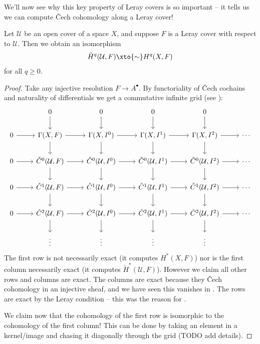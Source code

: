 \documentclass[11pt]{book}
\begin{document}
We'll now see why this key property of Leray covers is so important -- it tells us we can compute \v{C}ech cohomology along a Leray cover!

\begin{theorem}\label{thm:leray} 
Let $\mathcal{U}$ be an open cover of a space $X$, and suppose $F$ is a Leray cover with respect to $\mathcal{U}$. Then we obtain an isomorphism
\begin{align*}
    \check{H}^q(\mathcal{U},F) \xto{\sim} H^q(X,F)
\end{align*}
for all $q\ge0$.
\end{theorem}
\begin{proof} Take any injective resolution $F \to A^\bullet$. By functoriality of \v{C}ech cochains and naturality of differentials we get a commutative infinite grid (see \cite[p.~193]{Bredon-sheaf}):
\[ \begin{tikzcd}
     & 0\dar & 0\dar & 0\dar & 0\dar & \\
    0\rar & {\Gamma(X,F)}\rar\dar & {\Gamma(X,I^0)}\rar\dar & {\Gamma(X,I^1)}\rar\dar & {\Gamma(X,I^2)}\rar\dar & \cdots\\
    0\rar & {\check{C}^0(\mathcal{U},F)}\rar\dar & {\check{C}^0(\mathcal{U},I^0)}\rar\dar & {\check{C}^0(\mathcal{U},I^1)}\rar\dar  & {\check{C}^0(\mathcal{U},I^2)}\rar\dar  & \cdots \\
    0\rar & {\check{C}^1(\mathcal{U},F)}\rar\dar & {\check{C}^1(\mathcal{U},I^0)}\rar\dar & {\check{C}^1(\mathcal{U},I^1)}\rar\dar  & {\check{C}^1(\mathcal{U},I^2)}\rar\dar  & \cdots \\
    0\rar & {\check{C}^2(\mathcal{U},F)}\rar\dar & {\check{C}^2(\mathcal{U},I^0)}\rar\dar & {\check{C}^2(\mathcal{U},I^1)}\rar\dar  & {\check{C}^2(\mathcal{U},I^2)}\rar\dar  & \cdots \\
    & \vdots  & \vdots  & \vdots  & \vdots  & 
\end{tikzcd} \]
The first row is not necessarily exact (it computes $H^\ast(X,F)$) nor is the first column necessarily exact (it computes $\check{H}^\ast(\mathcal{U},F)$). However we claim all other rows and columns are exact. The columns are exact because they \v{C}ech cohomology in an injective sheaf, and we have seen this vanishes in . The rows are exact by the Leray condition -- this was the reason for .

We claim now that the cohomology of the first row is isomorphic to the cohomology of the first column! This can be done by taking an element in a kernel/image and chasing it diagonally through the grid (TODO add details).
\end{proof}
\end{document}
